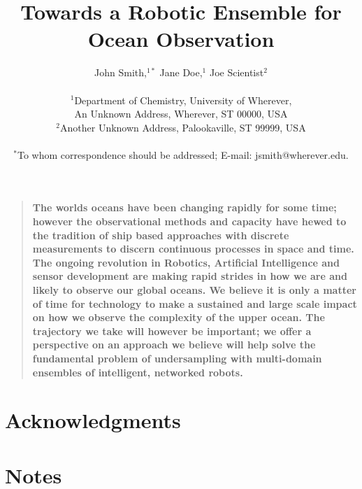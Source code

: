 \documentclass[12pt]{article}
\title{Towards a Robotic Ensemble for Ocean Observation}
\author
{John Smith,$^{1\ast}$ Jane Doe,$^{1}$ Joe Scientist$^{2}$\\
\\
\normalsize{$^{1}$Department of Chemistry, University of Wherever,}\\
\normalsize{An Unknown Address, Wherever, ST 00000, USA}\\
\normalsize{$^{2}$Another Unknown Address, Palookaville, ST 99999, USA}\\
\\
\normalsize{$^\ast$To whom correspondence should be addressed; E-mail:  jsmith@wherever.edu.}
}
\date{}
\newenvironment{sciabstract}{%
\begin{quote} \bf}
{\end{quote}}
\begin{document}

\maketitle 


\begin{sciabstract}
  The worlds oceans have been changing rapidly for some time; however
  the observational methods and capacity have hewed to the tradition
  of ship based approaches with discrete measurements to discern
  continuous processes in space and time.  The ongoing revolution in
  Robotics, Artificial Intelligence and sensor development are making
  rapid strides in how we are and likely to observe our global
  oceans. We believe it is only a matter of time for technology to
  make a sustained and large scale impact on how we observe the
  complexity of the upper ocean. The trajectory we take will however
  be important; we offer a perspective on an approach we believe will
  help solve the fundamental problem of undersampling with
  multi-domain ensembles of intelligent, networked robots.
  
  
\end{sciabstract}






  








\section*{Acknowledgments}

\section{Notes}




\end{document}
